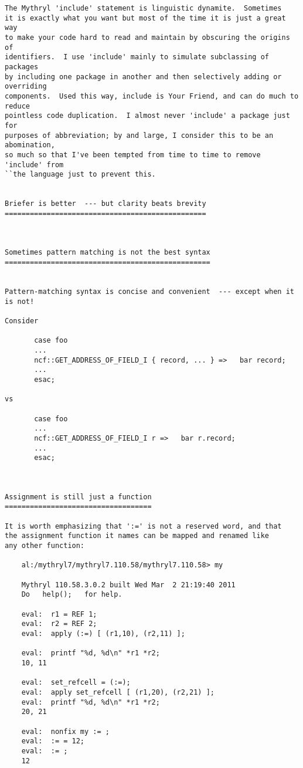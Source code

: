 \begin{verbatim}
The Mythryl 'include' statement is linguistic dynamite.  Sometimes 
it is exactly what you want but most of the time it is just a great way 
to make your code hard to read and maintain by obscuring the origins of 
identifiers.  I use 'include' mainly to simulate subclassing of packages 
by including one package in another and then selectively adding or overriding 
components.  Used this way, include is Your Friend, and can do much to reduce 
pointless code duplication.  I almost never 'include' a package just for 
purposes of abbreviation; by and large, I consider this to be an abomination, 
so much so that I've been tempted from time to time to remove 'include' from 
``the language just to prevent this. 


Briefer is better  --- but clarity beats brevity 
================================================ 



Sometimes pattern matching is not the best syntax 
================================================= 


Pattern-matching syntax is concise and convenient  --- except when it is not! 

Consider 

       case foo 
	   ...  
	   ncf::GET_ADDRESS_OF_FIELD_I { record, ... } =>   bar record; 
	   ...  
       esac; 

vs 

       case foo 
	   ...  
	   ncf::GET_ADDRESS_OF_FIELD_I r =>   bar r.record; 
	   ...  
       esac; 



Assignment is still just a function 
=================================== 

It is worth emphasizing that ':=' is not a reserved word, and that 
the assignment function it names can be mapped and renamed like 
any other function: 

    al:/mythryl7/mythryl7.110.58/mythryl7.110.58> my 

    Mythryl 110.58.3.0.2 built Wed Mar  2 21:19:40 2011 
    Do   help();   for help.

    eval:  r1 = REF 1; 
    eval:  r2 = REF 2; 
    eval:  apply (:=) [ (r1,10), (r2,11) ]; 

    eval:  printf "%d, %d\n" *r1 *r2; 
    10, 11 

    eval:  set_refcell = (:=); 
    eval:  apply set_refcell [ (r1,20), (r2,21) ]; 
    eval:  printf "%d, %d\n" *r1 *r2; 
    20, 21 

    eval:  nonfix my := ; 
    eval:  := = 12; 
    eval:  := ; 
    12 







\end{verbatim}

